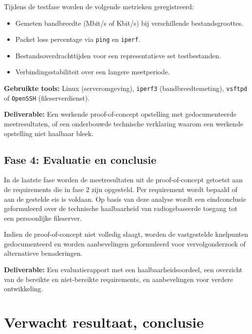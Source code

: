 Tijdens de testfase worden de volgende metrieken geregistreerd:

\begin{itemize}
  \item Gemeten bandbreedte (Mbit/s of Kbit/s) bij verschillende bestandsgroottes.
  \item Packet loss percentage via \texttt{ping} en \texttt{iperf}.
  \item Bestandsoverdrachttijden voor een representatieve set testbestanden.
  \item Verbindingsstabiliteit over een langere meetperiode.
\end{itemize}

\textbf{Gebruikte tools:} Linux (serveromgeving), \texttt{iperf3} (bandbreedtemeting), \texttt{vsftpd} of \texttt{OpenSSH} (fileserverdienst).

\textbf{Deliverable:} Een werkende proof-of-concept opstelling met gedocumenteerde meetresultaten, of een onderbouwde technische verklaring waarom een werkende opstelling niet haalbaar bleek.

\subsection{Fase 4: Evaluatie en conclusie}

In de laatste fase worden de meetresultaten uit de proof-of-concept getoetst aan de requirements die in fase 2 zijn opgesteld. Per requirement wordt bepaald of aan de gestelde eis is voldaan. Op basis van deze analyse wordt een eindconclusie geformuleerd over de technische haalbaarheid van radiogebaseerde toegang tot een persoonlijke fileserver.

Indien de proof-of-concept niet volledig slaagt, worden de vastgestelde knelpunten gedocumenteerd en worden aanbevelingen geformuleerd voor vervolgonderzoek of alternatieve benaderingen.

\textbf{Deliverable:} Een evaluatierapport met een haalbaarheidsoordeel, een overzicht van de bereikte en niet-bereikte requirements, en aanbevelingen voor verdere ontwikkeling.
\section{Verwacht resultaat, conclusie}%
\label{sec:verwachte_resultaten}


